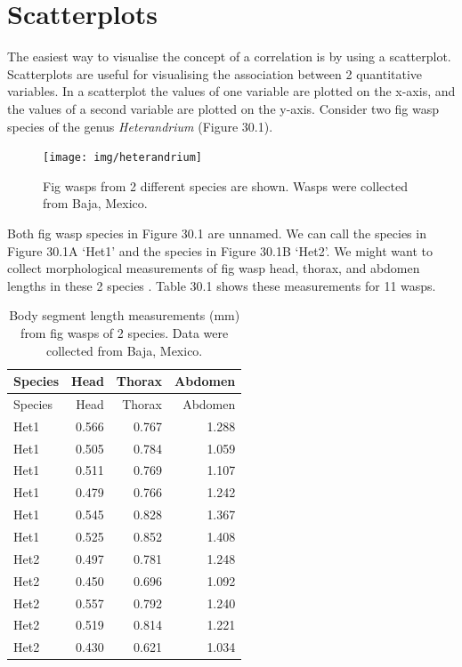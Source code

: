 \documentclass[
]{scrbook}
\begin{document}
\hypertarget{scatterplots}{%
\section{Scatterplots}\label{scatterplots}}

The easiest way to visualise the concept of a correlation is by using a scatterplot.
Scatterplots are useful for visualising the association between 2 quantitative variables.
In a scatterplot the values of one variable are plotted on the x-axis, and the values of a second variable are plotted on the y-axis.
Consider two fig wasp species of the genus \emph{Heterandrium} (Figure 30.1).

\begin{figure}
\texttt{[image: img/heterandrium]} \caption{Fig wasps from 2 different species are shown. Wasps were collected from Baja, Mexico.}\label{fig:unnamed-chunk-145}
\end{figure}

Both fig wasp species in Figure 30.1 are unnamed.
We can call the species in Figure 30.1A `Het1' and the species in Figure 30.1B `Het2'.
We might want to collect morphological measurements of fig wasp head, thorax, and abdomen lengths in these 2 species \citep{Duthie2015b}.
Table 30.1 shows these measurements for 11 wasps.

\begin{longtable}[]{@{}lrrr@{}}
\caption{\label{tab:unnamed-chunk-146}Body segment length measurements (mm) from fig wasps of 2 species. Data were collected from Baja, Mexico.}\tabularnewline
\toprule
Species & Head & Thorax & Abdomen \\
\midrule
\endfirsthead
\toprule
Species & Head & Thorax & Abdomen \\
\midrule
\endhead
Het1 & 0.566 & 0.767 & 1.288 \\
Het1 & 0.505 & 0.784 & 1.059 \\
Het1 & 0.511 & 0.769 & 1.107 \\
Het1 & 0.479 & 0.766 & 1.242 \\
Het1 & 0.545 & 0.828 & 1.367 \\
Het1 & 0.525 & 0.852 & 1.408 \\
Het2 & 0.497 & 0.781 & 1.248 \\
Het2 & 0.450 & 0.696 & 1.092 \\
Het2 & 0.557 & 0.792 & 1.240 \\
Het2 & 0.519 & 0.814 & 1.221 \\
Het2 & 0.430 & 0.621 & 1.034 \\
\bottomrule
\end{longtable}
\end{document}
